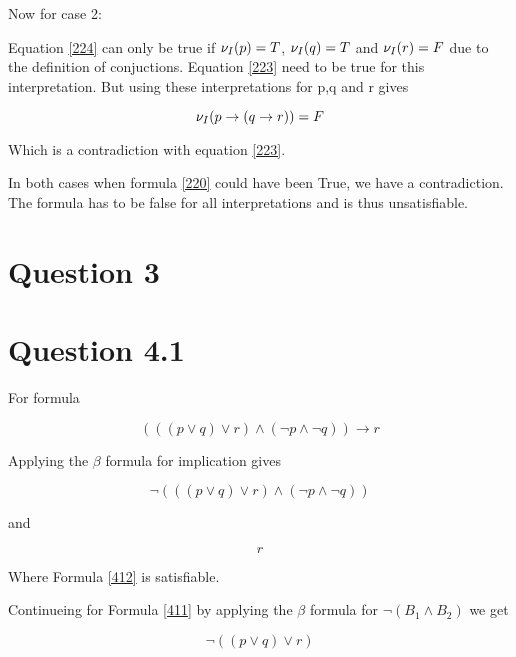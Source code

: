 \documentclass[10pt,a4paper]{article}
\begin{document}
Now for case 2:

Equation \ref{224} can only be true if $\nu_I(p) = T$, $\nu_I(q) = T$ and $\nu_I(r) = F$ due to the definition of conjuctions. 
Equation \ref{223} need to be true for this interpretation. But using these interpretations for p,q and r gives

\begin{equation}
\nu_I(p \rightarrow ( q \rightarrow r )) = F
\end{equation}

Which is a contradiction with equation \ref{223}.

In both cases when formula \ref{220} could have been True, we have a contradiction. 
The formula has to be false for all interpretations and is thus unsatisfiable.





\section{Question 3}










\section{Question 4.1}
For formula

\begin{equation}
\label{41}
 ((( p \vee q) \vee r ) \wedge ( \neg p \wedge \neg q )) \rightarrow r
\end{equation}

Applying the $\beta$ formula for implication gives

\begin{equation}
\label{411}
 \neg  ((( p \vee q) \vee r ) \wedge ( \neg p \wedge \neg q ))
\end{equation}

and

\begin{equation}
\label{412}
 r
\end{equation}

Where Formula \ref{412} is satisfiable.

Continueing for Formula \ref{411} by applying the $\beta$ formula for $\neg (B_1 \wedge B_2)$ we get



 \begin{equation}
 \label{4111}
  \neg (( p \vee q ) \vee r )
 \end{equation}
\end{document}
